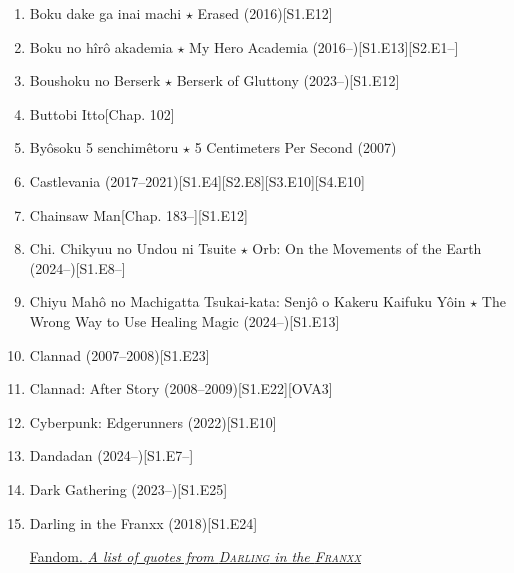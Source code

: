 \documentclass{article}
\begin{document}
\begin{enumerate}
\begin{itemize}
    \end{itemize}
    \item {\sc Boku dake ga inai machi $\star$ Erased} (2016)\hfill[S1.E12]
    \item Boku no hîrô akademia $\star$ My Hero Academia (2016--)\hfill[S1.E13][S2.E1--]
    \item {\sc Boushoku no Berserk $\star$ Berserk of Gluttony} (2023--)\hfill[S1.E12]
    \item {\sc Buttobi Itto}\hfill[Chap. 102]
    \item {\sc By\^osoku 5 senchimêtoru $\star$ 5 Centimeters Per Second} (2007)
    \item {\sc Castlevania} (2017--2021)\hfill[S1.E4][S2.E8][S3.E10][S4.E10]
    \item {\sc Chainsaw Man}\hfill[Chap. 183--][S1.E12]
    \item Chi. Chikyuu no Undou ni Tsuite $\star$ Orb: On the Movements of the Earth (2024--)\hfill[S1.E8--]
    \item {\sc Chiyu Mahô no Machigatta Tsukai-kata: Senjô o Kakeru Kaifuku Yôin $\star$ The Wrong Way to Use Healing Magic} (2024--)[S1.E13]
    \item {\sc Clannad} (2007--2008)\hfill[S1.E23]
    \item {\sc Clannad: After Story} (2008--2009)\hfill[S1.E22][OVA3]
    \item {\sc Cyberpunk: Edgerunners} (2022)\hfill[S1.E10]
    \item Dandadan (2024--)\hfill[S1.E7--]
    \item {\sc Dark Gathering} (2023--)\hfill[S1.E25]
    \item {\sc Darling in the Franxx} (2018)\hfill[S1.E24]
    
    \href{https://darling-in-the-franxx.fandom.com/wiki/List_of_Quotes}{Fandom. {\it A list of quotes from \textsc{Darling} in the \textsc{Franxx}}}
    

\end{enumerate}
\end{document}
